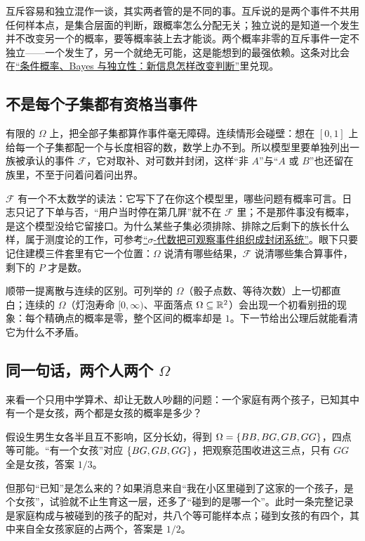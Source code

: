 互斥容易和独立混作一谈，其实两者管的是不同的事。互斥说的是两个事件不共用任何样本点，是集合层面的判断，跟概率怎么分配无关；独立说的是知道一个发生并不改变另一个的概率，要等概率装上去才能谈。两个概率非零的互斥事件一定不独立——一个发生了，另一个就绝无可能，这是能想到的最强依赖。这条对比会在\hyperref[ch:038]{``条件概率、Bayes 与独立性：新信息怎样改变判断''}里兑现。

\subsection{不是每个子集都有资格当事件}

有限的 \(\Omega\) 上，把全部子集都算作事件毫无障碍。连续情形会碰壁：想在 \([0,1]\) 上给每一个子集都配一个与长度相容的数，数学上办不到。所以模型里要单独列出一族被承认的事件 \(\mathcal F\)，它对取补、对可数并封闭，这样``非 \(A\)''与``\(A\) 或 \(B\)''也还留在族里，不至于问着问着问出界。

\(\mathcal F\) 有一个不太数学的读法：它写下了在你这个模型里，哪些问题有概率可言。日志只记了下单与否，``用户当时停在第几屏''就不在 \(\mathcal F\) 里；不是那件事没有概率，是这个模型没给它留接口。为什么某些子集必须排除、排除之后剩下的族长什么样，属于测度论的工作，可参考\hyperref[sec:12-Real-Analysis-Support/05-Measure-Integration-and-Conditional-Expectation/01]{``\(\sigma\)-代数把可观察事件组织成封闭系统''}。眼下只要记住建模三件套里有它一个位置：\(\Omega\) 说清有哪些结果，\(\mathcal F\) 说清哪些集合算事件，剩下的 \(P\) 才是数。

顺带一提离散与连续的区别。可列举的 \(\Omega\)（骰子点数、等待次数）上一切都直白；连续的 \(\Omega\)（灯泡寿命 \([0,\infty)\)、平面落点 \(\Omega\subseteq\mathbb{R}^2\)）会出现一个初看别扭的现象：每个精确点的概率是零，整个区间的概率却是 \(1\)。下一节给出公理后就能看清它为什么不矛盾。

\subsection{同一句话，两个人两个 \texorpdfstring{\(\Omega\)}{Omega}}

来看一个只用中学算术、却让无数人吵翻的问题：一个家庭有两个孩子，已知其中有一个是女孩，两个都是女孩的概率是多少？

假设生男生女各半且互不影响，区分长幼，得到 \(\Omega=\left\{BB,BG,GB,GG\right\}\)，四点等可能。``有一个女孩''对应 \(\left\{BG,GB,GG\right\}\)，把观察范围收进这三点，只有 \(GG\) 全是女孩，答案 \(1/3\)。

但那句``已知''是怎么来的？如果消息来自``我在小区里碰到了这家的一个孩子，是个女孩''，试验就不止生育这一层，还多了``碰到的是哪一个''。此时一条完整记录是家庭构成与被碰到的孩子的配对，共八个等可能样本点；碰到女孩的有四个，其中来自全女孩家庭的占两个，答案是 \(1/2\)。

